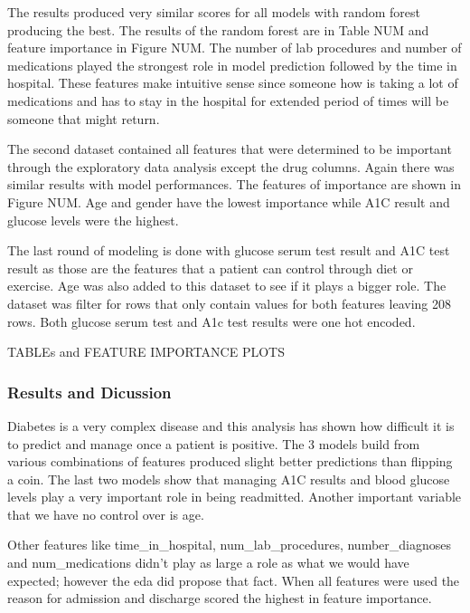 \documentclass[5p]{elsarticle} %
\begin{document}
The results produced very similar scores for all models with random
forest producing the best. The results of the random forest are in Table
NUM and feature importance in Figure NUM. The number of lab procedures
and number of medications played the strongest role in model prediction
followed by the time in hospital. These features make intuitive sense
since someone how is taking a lot of medications and has to stay in the
hospital for extended period of times will be someone that might return.

The second dataset contained all features that were determined to be
important through the exploratory data analysis except the drug columns.
Again there was similar results with model performances. The features of
importance are shown in Figure NUM. Age and gender have the lowest
importance while A1C result and glucose levels were the highest.

The last round of modeling is done with glucose serum test result and
A1C test result as those are the features that a patient can control
through diet or exercise. Age was also added to this dataset to see if
it plays a bigger role. The dataset was filter for rows that only
contain values for both features leaving 208 rows. Both glucose serum
test and A1c test results were one hot encoded.

\clearpage
\onecolumn

TABLEs and FEATURE IMPORTANCE PLOTS

\clearpage
\twocolumn

\hypertarget{results-and-dicussion}{%
\subsubsection{Results and Dicussion}\label{results-and-dicussion}}

Diabetes is a very complex disease and this analysis has shown how
difficult it is to predict and manage once a patient is positive. The 3
models build from various combinations of features produced slight
better predictions than flipping a coin. The last two models show that
managing A1C results and blood glucose levels play a very important role
in being readmitted. Another important variable that we have no control
over is age.

Other features like time\_in\_hospital, num\_lab\_procedures,
number\_diagnoses and num\_medications didn't play as large a role as
what we would have expected; however the eda did propose that fact. When
all features were used the reason for admission and discharge scored the
highest in feature importance.
\end{document}
